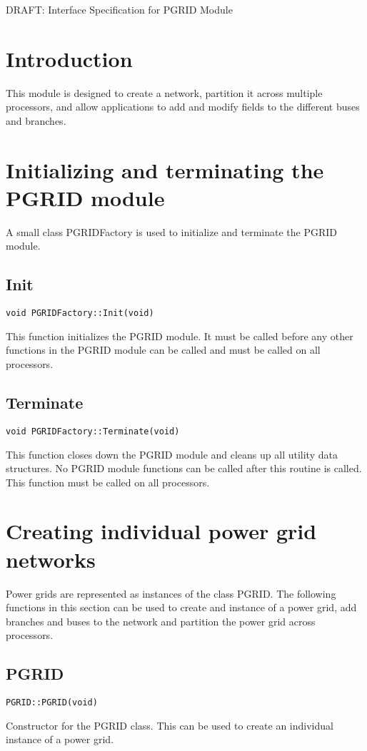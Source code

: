\documentclass[12pt]{article}
\begin{document}
\begin{titlepage}
\begin{center}
{\LARGE DRAFT: Interface Specification for PGRID Module}
\end{center}
\end{titlepage}
\newpage
\pagestyle{plain}
\section{Introduction}
This module is designed to create a network, partition it across multiple
processors, and allow applications to add and modify fields to the different
buses and branches.
\section{Initializing and terminating the PGRID module}
A small class PGRIDFactory is used to initialize and terminate the PGRID module.
\subsection{Init}
\begin{verbatim}
void PGRIDFactory::Init(void)
\end{verbatim}
This function initializes the PGRID module. It must be called before any other
functions in the PGRID module can be called and must be called on all
processors.
\subsection{Terminate}
\begin{verbatim}
void PGRIDFactory::Terminate(void)
\end{verbatim}
This function closes down the PGRID module and cleans up all utility data
structures. No PGRID module functions can be called after this routine is
called. This function must be called on all processors.

\section{Creating individual power grid networks}
Power grids are represented as instances of the class PGRID. The following
functions in this section can be used to create and instance of a power grid,
add branches and buses to the network and partition the power grid across
processors.
\subsection{PGRID}
\begin{verbatim}
PGRID::PGRID(void)
\end{verbatim}
Constructor for the PGRID class. This can be used to create an individual
instance of a power grid.
\end{document}
